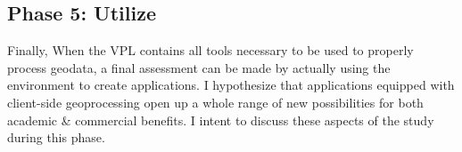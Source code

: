 \subsection{Phase 5: Utilize}

Finally, When the VPL contains all tools necessary to be used to properly process geodata, a final assessment can be made by actually using the environment to create applications.
I hypothesize that applications equipped with client-side geoprocessing open up a whole range of new possibilities for both academic \& commercial benefits. 
I intent to discuss these aspects of the study during this phase. 





